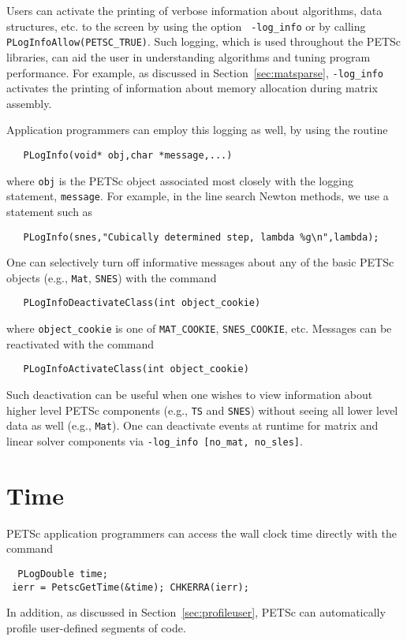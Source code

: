 {Users can activate the printing of verbose information about
algorithms, data structures, etc. to the screen by using the option {\tt
-log\_info}  or by calling {\tt
PLogInfoAllow(PETSC\_TRUE)}. 
Such logging, which is used throughout the PETSc libraries,
can aid the user in understanding algorithms and 
tuning program performance.  For example, as discussed in
Section~\ref{sec:matsparse}, {\tt -log\_info} activates the
printing of information about memory allocation during
matrix assembly.

Application programmers can employ this logging as well, by
using the routine 
\begin{verbatim}
   PLogInfo(void* obj,char *message,...)
\end{verbatim}
where {\tt obj} is the PETSc object associated most closely with
the logging statement, {\tt message}.
For example, in the line search Newton methods, we use a statement such as
\begin{verbatim}
   PLogInfo(snes,"Cubically determined step, lambda %g\n",lambda);
\end{verbatim}

One can selectively turn off informative messages about any of the 
basic PETSc objects (e.g., {\tt Mat}, {\tt SNES}) with the command
\begin{verbatim}
   PLogInfoDeactivateClass(int object_cookie)
\end{verbatim}
where  
{\tt object\_cookie} is one of {\tt MAT\_COOKIE}, {\tt SNES\_COOKIE}, etc.
Messages can be reactivated with the command
\begin{verbatim}
   PLogInfoActivateClass(int object_cookie)
\end{verbatim}
Such deactivation can be useful when one wishes to view information
about higher level PETSc components (e.g., {\tt TS} and {\tt SNES}) without 
seeing all lower level data as well (e.g., {\tt Mat}).  One can deactivate
events at runtime for matrix and linear solver components via {\tt -log\_info [no\_mat, no\_sles]}.

\section{Time}

PETSc application programmers can access the wall clock time directly 
with the command 
\begin{verbatim}
  PLogDouble time;
 ierr = PetscGetTime(&time); CHKERRA(ierr);
\end{verbatim}
 
In addition, as discussed in Section~\ref{sec:profileuser},
PETSc can automatically profile user-defined segments of code.

}

